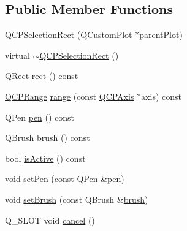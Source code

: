 \subsection*{Public Member Functions}
\begin{DoxyCompactItemize}
\item 
\hyperlink{class_q_c_p_selection_rect_ade6ee59fabcc585a1e281eb527b01867}{Q\+C\+P\+Selection\+Rect} (\hyperlink{class_q_custom_plot}{Q\+Custom\+Plot} $\ast$\hyperlink{class_q_c_p_layerable_a473edb813a4c1929d6b6a8fe3ff3faf7}{parent\+Plot})
\item 
virtual \hyperlink{class_q_c_p_selection_rect_aded186aabcdc3ee51775b7c5063e199a}{$\sim$\+Q\+C\+P\+Selection\+Rect} ()
\item 
Q\+Rect \hyperlink{class_q_c_p_selection_rect_a3812115ae4dfe2855bf1e58331c14805}{rect} () const
\item 
\hyperlink{class_q_c_p_range}{Q\+C\+P\+Range} \hyperlink{class_q_c_p_selection_rect_a23ab082ffa04be1dbf9afb9e633ab815}{range} (const \hyperlink{class_q_c_p_axis}{Q\+C\+P\+Axis} $\ast$axis) const
\item 
Q\+Pen \hyperlink{class_q_c_p_selection_rect_ab4229f8faeaffba9617d2e6c4779b765}{pen} () const
\item 
Q\+Brush \hyperlink{class_q_c_p_selection_rect_a9669c77c5796dea9dc089a088d50ebfb}{brush} () const
\item 
bool \hyperlink{class_q_c_p_selection_rect_ad27c1569c6ea8fa48e24b81e2a302df3}{is\+Active} () const
\item 
void \hyperlink{class_q_c_p_selection_rect_ada20b7fb1b2dcbe50523262636b06963}{set\+Pen} (const Q\+Pen \&\hyperlink{class_q_c_p_selection_rect_ab4229f8faeaffba9617d2e6c4779b765}{pen})
\item 
void \hyperlink{class_q_c_p_selection_rect_ab0c66f1484418782efa01f4153611080}{set\+Brush} (const Q\+Brush \&\hyperlink{class_q_c_p_selection_rect_a9669c77c5796dea9dc089a088d50ebfb}{brush})
\item 
Q\+\_\+\+S\+L\+OT void \hyperlink{class_q_c_p_selection_rect_af67bc58f4f5ce9a4dc420b9c42de235a}{cancel} ()
\end{DoxyCompactItemize}
